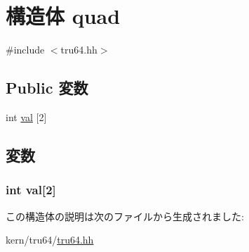 \hypertarget{structTru64_1_1quad}{
\section{構造体 quad}
\label{structTru64_1_1quad}
}


{\ttfamily \#include $<$tru64.hh$>$}\subsection*{Public 変数}
\begin{DoxyCompactItemize}
\item 
int \hyperlink{structTru64_1_1quad_a30664d3c0c4c94c52f1b946ceae73842}{val} \mbox{[}2\mbox{]}
\end{DoxyCompactItemize}


\subsection{変数}
\hypertarget{structTru64_1_1quad_a30664d3c0c4c94c52f1b946ceae73842}{
\subsubsection[{val}]{\setlength{\rightskip}{0pt plus 5cm}int {\bf val}\mbox{[}2\mbox{]}}}
\label{structTru64_1_1quad_a30664d3c0c4c94c52f1b946ceae73842}


この構造体の説明は次のファイルから生成されました:\begin{DoxyCompactItemize}
\item 
kern/tru64/\hyperlink{kern_2tru64_2tru64_8hh}{tru64.hh}\end{DoxyCompactItemize}

